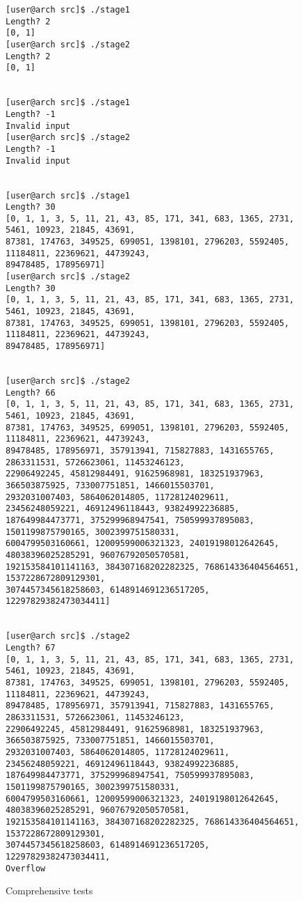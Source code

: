 \documentclass{article}
\begin{document}
\begin{figure}[H]
\begin{verbatim}
[user@arch src]$ ./stage1
Length? 2
[0, 1]
[user@arch src]$ ./stage2
Length? 2
[0, 1]


[user@arch src]$ ./stage1
Length? -1
Invalid input
[user@arch src]$ ./stage2
Length? -1
Invalid input


[user@arch src]$ ./stage1
Length? 30
[0, 1, 1, 3, 5, 11, 21, 43, 85, 171, 341, 683, 1365, 2731, 5461, 10923, 21845, 43691,
87381, 174763, 349525, 699051, 1398101, 2796203, 5592405, 11184811, 22369621, 44739243,
89478485, 178956971]
[user@arch src]$ ./stage2
Length? 30
[0, 1, 1, 3, 5, 11, 21, 43, 85, 171, 341, 683, 1365, 2731, 5461, 10923, 21845, 43691,
87381, 174763, 349525, 699051, 1398101, 2796203, 5592405, 11184811, 22369621, 44739243,
89478485, 178956971]


[user@arch src]$ ./stage2
Length? 66
[0, 1, 1, 3, 5, 11, 21, 43, 85, 171, 341, 683, 1365, 2731, 5461, 10923, 21845, 43691,
87381, 174763, 349525, 699051, 1398101, 2796203, 5592405, 11184811, 22369621, 44739243,
89478485, 178956971, 357913941, 715827883, 1431655765, 2863311531, 5726623061, 11453246123,
22906492245, 45812984491, 91625968981, 183251937963, 366503875925, 733007751851, 1466015503701,
2932031007403, 5864062014805, 11728124029611, 23456248059221, 46912496118443, 93824992236885,
187649984473771, 375299968947541, 750599937895083, 1501199875790165, 3002399751580331,
6004799503160661, 12009599006321323, 24019198012642645, 48038396025285291, 96076792050570581,
192153584101141163, 384307168202282325, 768614336404564651, 1537228672809129301,
3074457345618258603, 6148914691236517205, 12297829382473034411]


[user@arch src]$ ./stage2
Length? 67
[0, 1, 1, 3, 5, 11, 21, 43, 85, 171, 341, 683, 1365, 2731, 5461, 10923, 21845, 43691,
87381, 174763, 349525, 699051, 1398101, 2796203, 5592405, 11184811, 22369621, 44739243,
89478485, 178956971, 357913941, 715827883, 1431655765, 2863311531, 5726623061, 11453246123,
22906492245, 45812984491, 91625968981, 183251937963, 366503875925, 733007751851, 1466015503701,
2932031007403, 5864062014805, 11728124029611, 23456248059221, 46912496118443, 93824992236885,
187649984473771, 375299968947541, 750599937895083, 1501199875790165, 3002399751580331,
6004799503160661, 12009599006321323, 24019198012642645, 48038396025285291, 96076792050570581,
192153584101141163, 384307168202282325, 768614336404564651, 1537228672809129301,
3074457345618258603, 6148914691236517205, 12297829382473034411, 
Overflow
\end{verbatim}
\caption{Comprehensive tests}
\end{figure}
\end{document}
